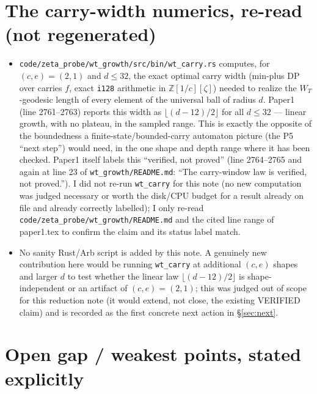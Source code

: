 \documentclass[11pt]{article}
\theoremstyle{remark}
\newcommand{\Z}{\mathbb Z}
\begin{document}
\section{The carry-width numerics, re-read (not regenerated)}\label{sec:verif}

\begin{itemize}
\item[(VERIFIED, in the narrow sense of ``re-read the existing output,'' not re-run)]
\texttt{code/zeta\_probe/wt\_growth/src/bin/wt\_carry.rs} computes, for $(c,e)=(2,1)$ and $d\le32$, the
exact optimal carry width (min-plus DP over carries $f$, exact \texttt{i128} arithmetic in
$\Z[1/c][\zeta]$) needed to realize the $W_T$-geodesic length of every element of the universal ball of
radius $d$. Paper1 (line 2761--2763) reports this width as $\lfloor(d-12)/2\rfloor$ for all $d\le32$ —
linear growth, with no plateau, in the sampled range. This is exactly the opposite of the boundedness a
finite-state/bounded-carry automaton picture (the P5 ``next step'') would need, in the one shape and
depth range where it has been checked. Paper1 itself labels this ``verified, not proved'' (line
2764--2765 and again at line 23 of \texttt{wt\_growth/README.md}: ``The carry-window law is verified,
not proved.''). I did not re-run \texttt{wt\_carry} for this note (no new computation was judged
necessary or worth the disk/CPU budget for a result already on file and already correctly labelled); I
only re-read \texttt{code/zeta\_probe/wt\_growth/README.md} and the cited line range of paper1.tex to
confirm the claim and its status label match.
\item No sanity Rust/Arb script is added by this note. A genuinely new contribution here would be
running \texttt{wt\_carry} at additional $(c,e)$ shapes and larger $d$ to test whether the linear law
$\lfloor(d-12)/2\rfloor$ is shape-independent or an artifact of $(c,e)=(2,1)$; this was judged out of
scope for this reduction note (it would extend, not close, the existing VERIFIED claim) and is recorded
as the first concrete next action in \S\ref{sec:next}.
\end{itemize}

\section{Open gap / weakest points, stated explicitly}\label{sec:weak}
\end{document}
